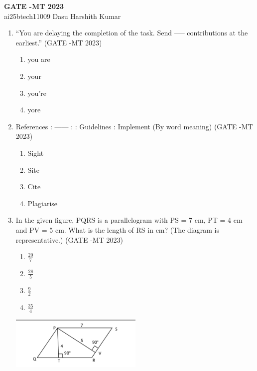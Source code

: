 \documentclass[12pt]{article}
\begin{document}
\begin{center}
    {\LARGE \bf GATE -MT 2023}\\[1em]
    ai25btech11009 \quad Dasu Harshith Kumar
\end{center}

\begin{enumerate}

\item “You are delaying the completion of the task. Send  ----- contributions at the earliest.”  (GATE -MT 2023)
 \begin{enumerate}[label=(\alph*)]
  \item you are
  \item your
  \item you’re
  \item yore
 \end{enumerate}

\item References : ------ : : Guidelines : Implement (By word meaning) (GATE -MT 2023)
\begin{enumerate}[label=(\alph*)]
  \item Sight
  \item Site
  \item Cite
  \item Plagiarise
\end{enumerate}

\item In the given figure, PQRS is a parallelogram with PS = 7 cm, PT = 4 cm and PV = 5 cm. What is the length of RS in cm? (The diagram is representative.) (GATE -MT 2023)
\begin{enumerate}[label=(\alph*)]
  \item \(\frac{20}{7}\)
  \item \(\frac{28}{5}\)
  \item \(\frac{9}{2}\)
  \item \(\frac{35}{4}\)
\end{enumerate}


\begin{center}
\includegraphics[width=0.5\textwidth]{images/qqq3i.jpg}
\end{center}


\end{enumerate}
\end{document}
